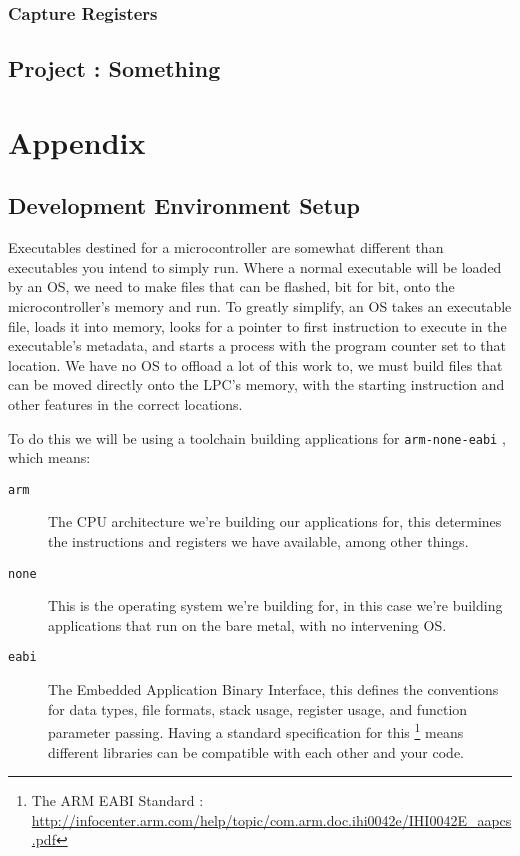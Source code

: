 \documentclass[]{article}
\begin{document}
\subsubsection{Capture Registers}

\subsection{Project : Something}

\newpage

\section{Appendix}

\subsection{Development Environment Setup}

Executables destined for a microcontroller are somewhat different than
executables you intend to simply run. Where a normal executable will be
loaded by an OS, we need to make files that can be flashed, bit for bit,
onto the microcontroller's memory and run. To greatly simplify, an OS
takes an executable file, loads it into memory, looks for a pointer to
first instruction to execute in the executable's metadata, and starts a
process with the program counter set to that location. We have no OS to
offload a lot of this work to, we must build files that can be moved
directly onto the LPC's memory, with the starting instruction and other
features in the correct locations.

To do this we will be using a toolchain building applications for
\texttt{arm-none-eabi} , which means:

\begin{description}
\item[\texttt{arm}]
The CPU architecture we're building our applications for, this
determines the instructions and registers we have available, among other
things.
\item[\texttt{none}]
This is the operating system we're building for, in this case we're
building applications that run on the bare metal, with no intervening
OS.
\item[\texttt{eabi}]
The Embedded Application Binary Interface, this defines the conventions
for data types, file formats, stack usage, register usage, and function
parameter passing. Having a standard specification for this \footnote{The
  ARM EABI Standard :
  \url{http://infocenter.arm.com/help/topic/com.arm.doc.ihi0042e/IHI0042E_aapcs.pdf}}
means different libraries can be compatible with each other and your
code.
\end{description}
\end{document}
